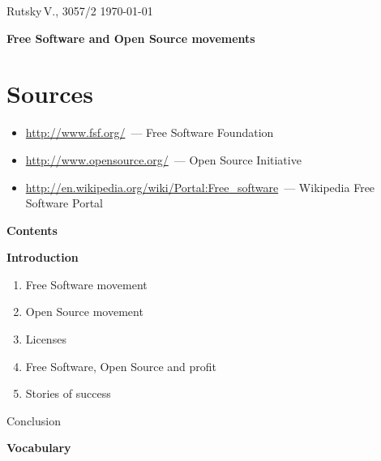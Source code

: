\documentclass[landscape,a5paper]{article}
\newcommand{\bit}{\begin{itemize}\setlength{\itemsep}{-0.65mm}}
\newcommand{\eit}{\end{itemize}}
\begin{document}

\pagestyle{empty}

\begin{flushright}
  Rutsky\,V., 3057/2 \qquad \today
\end{flushright}

\begin{center}
{\LARGE \bfseries Free Software and Open Source movements}
\end{center}

\section*{Sources}
  \bit
    \item \url{http://www.fsf.org/}~--- Free Software Foundation
    \item \url{http://www.opensource.org/}~--- Open Source Initiative
    \item \url{http://en.wikipedia.org/wiki/Portal:Free_software}~--- Wikipedia Free Software Portal
  \eit

\begin{center}
{\Large \bfseries Contents}
\end{center}

\begin{center}
\begin{minipage}[center]{10cm}
{\bfseries 
Introduction
\begin{enumerate}

  \item {Free Software movement}
  \item {Open Source movement}
  \item {Licenses}
  \item {Free Software, Open Source and profit}
  \item {Stories of success}
\end{enumerate}
Conclusion
}

\end{minipage}
\end{center}

\begin{center}
{\Large \bfseries Vocabulary}
\end{center}
\end{document}
